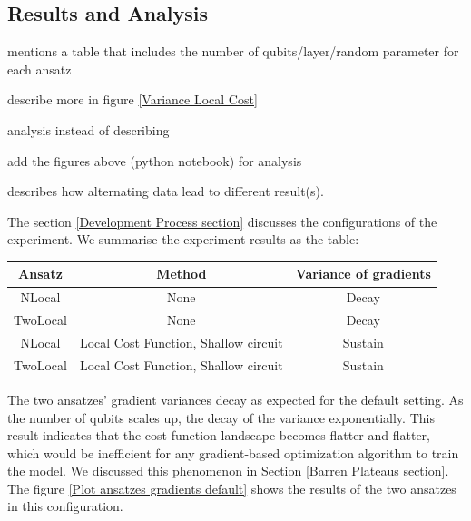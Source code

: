 \subsection{Results and Analysis}

\begin{todolist}
\item mentions a table that includes the number of qubits/layer/random parameter for each ansatz
\item describe more in figure \ref{Variance Local Cost}
\item analysis instead of describing
\item add the figures above (python notebook) for analysis
\item describes how alternating data lead to different result(s).
\end{todolist}

The section \ref{Development Process section} discusses the configurations of the experiment. 
We summarise the experiment results as the table:
\begin{center}
    \begin{tabular}{|| c c c ||}
        \hline
        Ansatz      & Method                                & Variance of gradients \\[0.5ex] 
        \hline \hline
        NLocal      & None                                  & Decay                 \\
        \hline
        TwoLocal    & None                                  & Decay                 \\
        \hline
        NLocal      & Local Cost Function, Shallow circuit  & Sustain               \\
        \hline
        TwoLocal    & Local Cost Function, Shallow circuit  & Sustain               \\
        \hline
    \end{tabular}
\end{center}

The two ansatzes' gradient variances decay as expected for the default setting.
As the number of qubits scales up, the decay of the variance exponentially. 
This result indicates that the cost function landscape becomes flatter and flatter, which would be inefficient for any gradient-based optimization algorithm to train the model.
We discussed this phenomenon in Section \ref{Barren Plateaus section}.
The figure \ref{Plot ansatzes gradients default} shows the results of the two ansatzes in this configuration.

